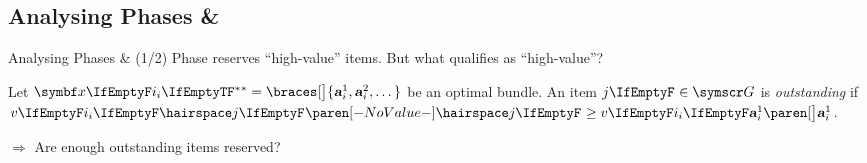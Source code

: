\subsection{Analysing Phases \texorpdfstring{\phasei{} \& \phaseiii}{I \& III}}
\begin{frame}{Analysing Phases \phasei{} \& \phaseiii{} (1/2)}
	Phase \phasei{} reserves \enquote{high-value} items.
	But what qualifies as \enquote{high-value}?

	\begin{definition}
		Let \(\alloc* = \braces[\big]{ \asgd*{1}, \asgd*{2}, \dots }\) be an optimal bundle.
		An item \(\genericitem \in \goods\) is \emph{outstanding} if \(\valuations[ \hairspace \genericitem] \ge \valuations[\asgd*{1}][\big]\).
	\end{definition}

	\(\Rightarrow\) Are enough outstanding items reserved?
\end{frame}

